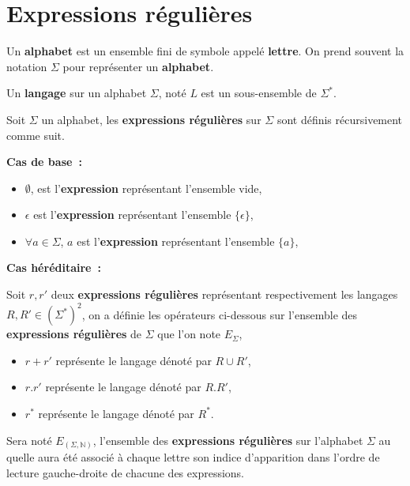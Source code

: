 \section{Expressions régulières}

\begin{Definition}
  Un \textbf{alphabet} est un ensemble fini de symbole appelé \textbf{lettre}.
  On prend souvent la notation \(\Sigma\) pour représenter un \textbf{alphabet}.
\end{Definition}

\begin{Definition}
  Un \textbf{langage} sur un alphabet \(\Sigma\), noté \(L\) est un 
  sous-ensemble de \(\Sigma^*\).
\end{Definition}

\begin{Definition}
  Soit \(\Sigma\) un alphabet, les \textbf{expressions régulières} sur 
  \(\Sigma\) sont définis récursivement comme suit.

  \noindent\textbf{Cas de base~:}

  \begin{itemize}
    \item \(\emptyset\), est l'\textbf{expression} représentant l'ensemble vide,
    \item \(\epsilon\) est l'\textbf{expression} représentant l'ensemble 
    \(\{\epsilon\}\),
    \item \(\forall a \in \Sigma\), \(a\) est l'\textbf{expression} représentant 
    l'ensemble \(\{a\}\),
  \end{itemize}

  \noindent\textbf{Cas héréditaire~:}

  Soit \(r, r'\) deux \textbf{expressions régulières} représentant 
  respectivement les langages \(R, R' \in (\Sigma^*)^2\), on a définie les 
  opérateurs ci-dessous sur l'ensemble des \textbf{expressions régulières} de 
  \(\Sigma\) que l'on note \(E_{\Sigma}\), 

  \begin{itemize}
    \item \(r + r'\) représente le langage dénoté par \(R \cup R'\),
    \item \(r . r'\) représente le langage dénoté par \(R . R'\),
    \item \(r^*\) représente le langage dénoté par \(R^*\).
  \end{itemize}
\end{Definition}

\begin{Definition}
  Sera noté \(E_{(\Sigma, \mathbb{N})}\), l'ensemble des 
  \textbf{expressions régulières} sur l'alphabet \(\Sigma\) au quelle aura été 
  associé à chaque lettre son indice d'apparition dans l'ordre de lecture 
  gauche-droite de chacune des expressions.
\end{Definition}

